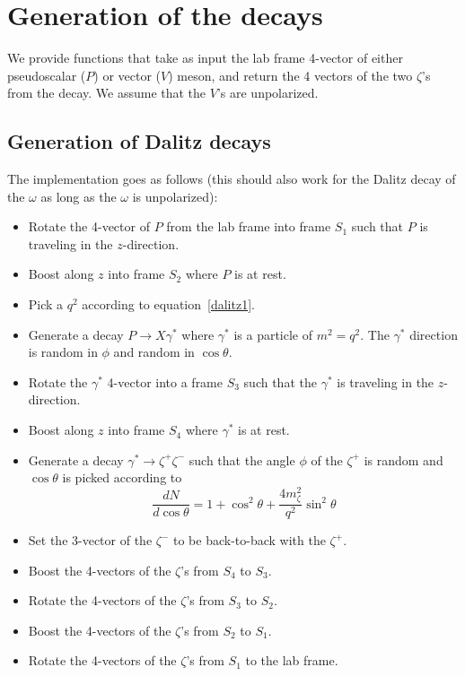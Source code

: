 \documentclass[12pt]{article}
\begin{document}
\section{Generation of the decays}

We provide functions that take as input the lab frame 4-vector of either pseudoscalar
($P$) or vector ($V$) meson, and return the 4 vectors of the two $\zeta$'s from the decay.
We assume that the $V$'s are unpolarized.


\subsection{Generation of Dalitz decays}
The implementation goes as follows (this should also work for the Dalitz
decay of the $\omega$ as long as the $\omega$ is unpolarized):
\begin{itemize}
\item Rotate the 4-vector of $P$ from the lab frame into frame
  $S_1$ such that $P$ is traveling in the $z$-direction.
\item Boost along $z$ into frame $S_2$ where $P$ is at rest.
\item Pick a $q^2$ according to equation~\ref{dalitz1}.
\item Generate a decay $P \to X \gamma^*$ where $\gamma^*$ is
  a particle of $m^2 = q^2$.  The $\gamma^*$ direction is random
  in $\phi$ and random in $\cos \theta$.
\item Rotate the $\gamma^*$ 4-vector into a frame $S_3$ 
  such that the $\gamma^*$ is traveling in the $z$-direction.
\item Boost along $z$ into frame $S_4$ where $\gamma^*$ is at rest.
\item Generate a decay $\gamma^* \to \zeta^+ \zeta^-$ such that
  the angle $\phi$ of the $\zeta^+$ is random and
  $\cos \theta$ is picked according to~\cite{adlarson}
  \begin{equation}
    \frac{dN}{d \cos \theta} = 1 + \cos^2\theta + \frac{4 m^2_\zeta}{q^2} \sin^2\theta
    \label{dalitzAngles}
  \end{equation}
\item  Set the 3-vector of the $\zeta^-$ to be back-to-back with the $\zeta^+$.
\item Boost the 4-vectors of the $\zeta$'s from $S_4$ to $S_3$.
\item Rotate the 4-vectors of the $\zeta$'s from $S_3$ to $S_2$.
\item Boost the 4-vectors of the $\zeta$'s from $S_2$ to $S_1$.
\item Rotate the 4-vectors of the $\zeta$'s from $S_1$ to the lab frame.
\end{itemize}
\end{document}
